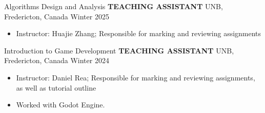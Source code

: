 
\begin{cventries}
    \cventry
    {Algorithms Design and Analysis}
    {\textbf{TEACHING ASSISTANT}}
    {UNB, Fredericton, Canada}
    {Winter 2025}
    {
        \begin{itemize}
            \item Instructor: Huajie Zhang; Responsible for marking and reviewing assignments
        \end{itemize}
    }
    \vspace{0.4 cm}
\end{cventries}
    
\begin{cventries}
    \cventry
    {Introduction to Game Development}
    {\textbf{TEACHING ASSISTANT}}
    {UNB, Fredericton, Canada}
    {Winter 2024}
    {
        \begin{itemize}
            \item Instructor: Daniel Rea; Responsible for marking and reviewing assignments, as well as tutorial outline
            \item Worked with Godot Engine.
        \end{itemize}
    }
    \vspace{0.4 cm}
\end{cventries}

